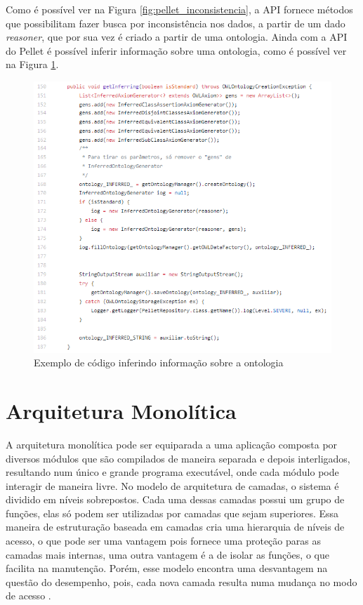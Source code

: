 \documentclass{bcc}
\begin{document}
Como é possível ver na Figura \ref{fig:pellet_inconsistencia}, a API fornece métodos que possibilitam fazer busca por inconsistência nos dados, a partir de um dado \textit{reasoner}, que por sua vez é criado a partir de uma ontologia. Ainda com a API do Pellet é possível inferir informação sobre uma ontologia, como é possível ver na Figura \ref{fig:pellet_inferencia}.


\begin{figure}[H]
\centering
\includegraphics[width=1\textwidth]{Figuras/pellet_inferencia.png}
\caption{Exemplo de código inferindo informação sobre a ontologia}
\label{fig:pellet_inferencia}
\end{figure}

\section{Arquitetura Monolítica}

A arquitetura monolítica pode ser equiparada a uma aplicação composta por diversos módulos que são compilados de maneira separada e depois interligados, resultando num único e grande programa executável, onde cada módulo pode interagir de maneira livre. No modelo de arquitetura de camadas, o sistema é dividido em níveis sobrepostos. Cada uma dessas camadas possui um grupo de funções, elas só podem ser utilizadas por camadas que sejam superiores. Essa maneira de estruturação baseada em camadas cria uma hierarquia de níveis de acesso, o que pode ser uma vantagem pois fornece uma proteção paras as camadas mais internas, uma outra vantagem é a de isolar as funções, o que facilita na manutenção. Porém, esse modelo encontra uma desvantagem na questão do desempenho, pois, cada nova camada resulta numa mudança no modo de acesso \cite{machado2004}.
\end{document}
